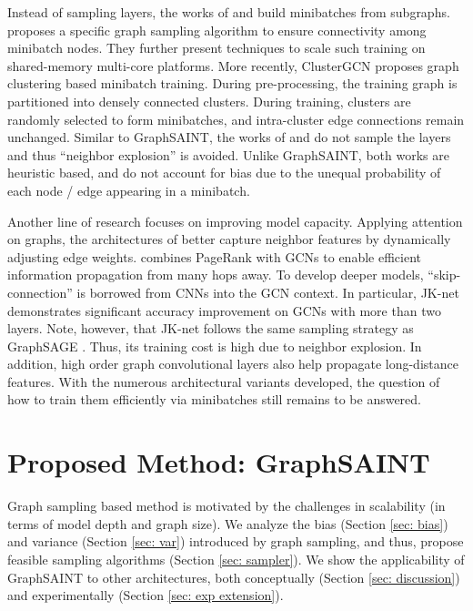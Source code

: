 \documentclass{article} \usepackage{iclr2020_conference,times}
\newcommand{\graphsaint}{{\fontfamily{lmtt}\selectfont GraphSAINT}}
\begin{document}
Instead of sampling layers, the works of \cite{ipdps_arxiv} and \cite{cluster-gcn} build minibatches from subgraphs. 
\cite{ipdps_arxiv} proposes a specific graph sampling algorithm to ensure connectivity among minibatch nodes. They further present techniques to scale such training on shared-memory multi-core platforms. 
More recently, ClusterGCN \citep{cluster-gcn} proposes graph clustering based minibatch training. 
During pre-processing, the training graph is partitioned into densely connected clusters. During training, clusters are randomly selected to form minibatches, and intra-cluster edge connections remain unchanged. 
Similar to {\graphsaint}, the works of \cite{ipdps_arxiv} and \cite{cluster-gcn} do not sample the layers and thus ``neighbor explosion'' is avoided. Unlike {\graphsaint}, both works are heuristic based, and do not account for bias due to the unequal probability of each node / edge appearing in a minibatch. 



Another line of research focuses on improving model capacity. Applying attention on graphs, the architectures of \cite{gat,gaan,graphstar} better capture neighbor features by dynamically adjusting edge weights. 
\cite{rw-gcn} combines PageRank with GCNs to enable efficient information propagation from many hops away. 
To develop deeper models, ``skip-connection'' is borrowed from CNNs \citep{resnet,densenet} into the GCN context. 
In particular, JK-net \cite{jk-net} demonstrates significant accuracy improvement on GCNs with more than two layers. Note, however, that JK-net \citep{jk-net} follows the same sampling strategy as GraphSAGE \citep{graphsage}. Thus, its training cost is high due to neighbor explosion. 
In addition, high order graph convolutional layers \citep{high-order-1,high-order-2,high-order-3} also help propagate long-distance features. 
With the numerous architectural variants developed, the question of how to train them efficiently via minibatches still remains to be answered.







%
 \section{Proposed Method: {\graphsaint}}



Graph sampling based method is motivated by the challenges in scalability (in terms of model depth and graph size). We analyze the bias (Section \ref{sec: bias}) and variance (Section \ref{sec: var}) introduced by graph sampling, and thus, propose feasible sampling algorithms (Section \ref{sec: sampler}). 
We show the applicability of {\graphsaint} to other architectures, both conceptually (Section \ref{sec: discussion}) and experimentally (Section \ref{sec: exp extension}).
\end{document}
